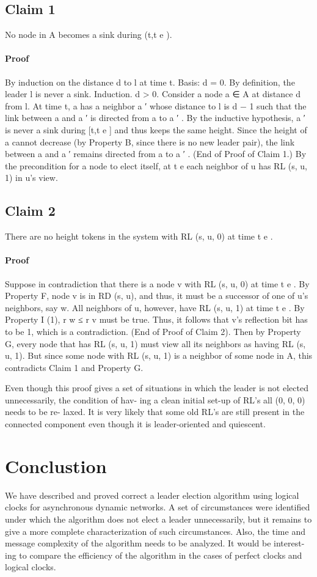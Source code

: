 \documentclass{article}
\begin{document}
\subsection{Claim 1}
No node in A becomes a sink during (t,t e ).
\paragraph{Proof}
By induction on the distance d to l at time t.
Basis: d = 0. By definition, the leader l is never a sink.
Induction. d > 0. Consider a node a ∈ A at distance d
from l. At time t, a has a neighbor a ′ whose distance to l is
d − 1 such that the link between a and a ′ is directed from a
to a ′ . By the inductive hypothesis, a ′ is never a sink during
[t,t e ] and thus keeps the same height. Since the height of
a cannot decrease (by Property B, since there is no new
leader pair), the link between a and a ′ remains directed
from a to a ′ . (End of Proof of Claim 1.)
By the precondition for a node to elect itself, at t e each
neighbor of u has RL (s, u, 1) in u’s view.
\subsection{Claim 2}
There are no height tokens in the system with RL
(s, u, 0) at time t e .
\paragraph{Proof}
Suppose in contradiction that there is a node v
with RL (s, u, 0) at time t e . By Property F, node v is in
RD (s, u), and thus, it must be a successor of one of u’s
neighbors, say w. All neighbors of u, however, have RL
(s, u, 1) at time t e . By Property I (1), r w ≤ r v must be true.
Thus, it follows that v’s reflection bit has to be 1, which is a
contradiction. (End of Proof of Claim 2).
Then by Property G, every node that has RL (s, u, 1) must
view all its neighbors as having RL (s, u, 1). But since some
node with RL (s, u, 1) is a neighbor of some node in A, this
contradicts Claim 1 and Property G.

Even though this proof gives a set of situations in which
the leader is not elected unnecessarily, the condition of hav-
ing a clean initial set-up of RL’s all (0, 0, 0) needs to be re-
laxed. It is very likely that some old RL’s are still present in
the connected component even though it is leader-oriented
and quiescent.
\section{Conclustion}
We have described and proved correct a leader election
algorithm using logical clocks for asynchronous dynamic
networks. A set of circumstances were identified under
which the algorithm does not elect a leader unnecessarily,
but it remains to give a more complete characterization of
such circumstances. Also, the time and message complexity
of the algorithm needs to be analyzed. It would be interest-
ing to compare the efficiency of the algorithm in the cases
of perfect clocks and logical clocks.
\end{document}
